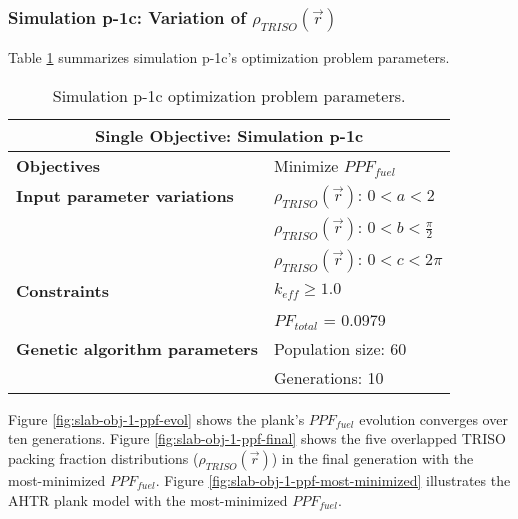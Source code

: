 \subsubsection{Simulation p-1c: Variation of $\rho_{TRISO}(\vec{r})$}
Table \ref{tab:simulationp1c} summarizes simulation p-1c's optimization problem parameters. 
\begin{table}[htbp!]
    \centering
    \onehalfspacing
    \caption{Simulation p-1c optimization problem parameters.}
	\label{tab:simulationp1c}
    \footnotesize
    \begin{tabular}{l|p{4cm}}
    \hline 
    \multicolumn{2}{c}{\textbf{Single Objective: Simulation p-1c}} \\
    \hline 
    \textbf{Objectives} & Minimize $PPF_{fuel}$ \\
    \hline 
    \textbf{Input parameter variations}
    & $\rho_{TRISO}(\vec{r})$: $0<a<2$ \\
    & $\rho_{TRISO}(\vec{r})$: $0<b<\frac{\pi}{2}$ \\
    & $\rho_{TRISO}(\vec{r})$: $0<c<2\pi$ \\
    \hline
    \textbf{Constraints} & $k_{eff} \geq 1.0$\\ 
    & $PF_{total}$ = 0.0979\\
    \hline 
    \textbf{Genetic algorithm parameters} & Population size: 60 \\
    & Generations: 10 \\
    \hline
    \end{tabular}
\end{table}
Figure \ref{fig:slab-obj-1-ppf-evol} shows the plank's $PPF_{fuel}$ evolution 
converges over ten generations.  
Figure \ref{fig:slab-obj-1-ppf-final} shows the five overlapped \gls{TRISO} 
packing fraction distributions ($\rho_{TRISO}(\vec{r})$) in the final generation 
with the most-minimized $PPF_{fuel}$. 
Figure \ref{fig:slab-obj-1-ppf-most-minimized} illustrates the \gls{AHTR} plank model 
with the most-minimized $PPF_{fuel}$. 
